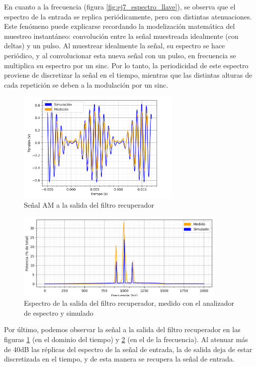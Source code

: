 \documentclass[a4paper]{article}
\begin{document}
En cuanto a la frecuencia (figura \ref{fig:ej7_espectro_llave}), se observa que el espectro de la entrada se replica peri\'odicamente, pero con distintas atenuaciones. Este fen\'omeno puede explicarse recordando la modelizaci\'on matem\'atica del muestreo instant\'aneo: convoluci\'on entre la se\~nal muestreada idealmente (con deltas) y un pulso. Al muestrear idealmente la se\~nal, su espectro se hace peri\'odico, y al convolucionar esta nueva se\~nal con un pulso, en frecuencia se multiplica su espectro por un sinc. Por lo tanto, la periodicidad de este espectro proviene de discretizar la se\~nal en el tiempo, mientras que las distintas alturas de cada repetici\'on se deben  a la modulaci\'on por un sinc.

\begin{figure}[htb]
	\centering
	\includegraphics[width=0.7\textwidth]{ej7_meds/med_20.png}
	\caption{Se\~nal AM a la salida del filtro recuperador}
	\label{fig:ej7_out}
\end{figure}

\begin{figure}[htb]
	\centering
	\includegraphics[width=0.9\textwidth]{ej7_meds/7_out.png}
	\caption{Espectro de la salida del filtro recuperador, medido con el analizador de espectro y simulado}
	\label{fig:ej7_espectro_out}
\end{figure}

Por \'ultimo, podemos observar la se\~nal a la salida del filtro recuperador en las figuras \ref{fig:ej7_out} (en el dominio del tiempo) y \ref{fig:ej7_espectro_out} (en el de la frecuencia). Al atenuar m\'as de 40dB las r\'eplicas del espectro de la se\~nal de entrada, la de salida deja de estar discretizada en el tiempo, y de esta manera se recupera la se\~nal de entrada.
\end{document}
